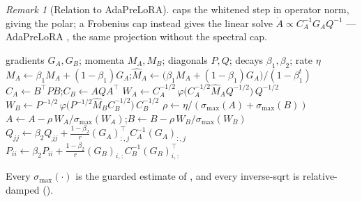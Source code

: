 \documentclass[11pt]{article}
\newcommand{\smax}{\sigma_{\max}}
\newcommand{\polar}{\varphi}                 %
\newcommand{\methodname}{\textsc{Polar-LoRA}\xspace}
\theoremstyle{plain}
\theoremstyle{definition}
\theoremstyle{remark}
\newtheorem{remark}{Remark}
\begin{document}
\begin{remark}[Relation to AdaPreLoRA]
 caps the whitened step in operator norm, giving the polar; a Frobenius cap instead gives the linear solve $\dot A\propto C_A^{-1}G_A Q^{-1}$ --- AdaPreLoRA \cite{adaprelora}, the same projection without the spectral cap.
\end{remark}

\begin{algorithm}[t]
\caption{\methodname{} step for one LoRA pair $(A,B)$ at iteration $t$}
\label{alg:ours}
\begin{algorithmic}[1]
\Require gradients $G_A,G_B$; momenta $M_A,M_B$; diagonals $P,Q$; decays $\beta_1,\beta_2$; rate $\eta$
\State $M_A\gets\beta_1 M_A+(1-\beta_1)G_A$;\quad $\hat M_A\gets\big(\beta_1 M_A+(1-\beta_1)G_A\big)/(1-\beta_1^{t})$ 
\State $C_A\gets B^\top P B$;\quad $C_B\gets A Q A^\top$ 
\State $W_A\gets C_A^{-1/2}\,\polar\!\big(C_A^{-1/2}\hat M_A Q^{-1/2}\big)\,Q^{-1/2}$
\State $W_B\gets P^{-1/2}\,\polar\!\big(P^{-1/2}\hat M_B C_B^{-1/2}\big)\,C_B^{-1/2}$
\State $\rho\gets\eta/(\smax(A)+\smax(B))$
\State $A\gets A-\rho\,W_A/\smax(W_A)$;\quad $B\gets B-\rho\,W_B/\smax(W_B)$
\State $Q_{jj}\gets\beta_2 Q_{jj}+\tfrac{1-\beta_2}{r}(G_A)_{:,j}^\top C_A^{-1}(G_A)_{:,j}$
\State $P_{ii}\gets\beta_2 P_{ii}+\tfrac{1-\beta_2}{r}(G_B)_{i,:}C_B^{-1}(G_B)_{i,:}^\top$
\end{algorithmic}
\end{algorithm}
\noindent Every $\smax(\cdot)$ is the guarded estimate of , and every inverse-sqrt is relative-damped ().
\end{document}
